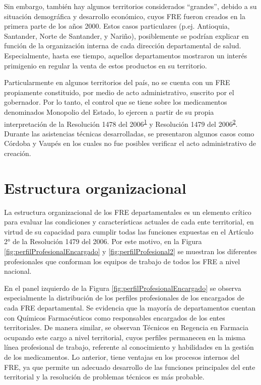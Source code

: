 \documentclass[
  oneside]{book}
\begin{document}
Sin embargo, también hay algunos territorios considerados ``grandes'', debido a su situación demográfica y desarrollo económico, cuyos FRE fueron creados en la primera parte de los años 2000. Estos casos particulares (p.ej. Antioquia, Santander, Norte de Santander, y Nariño), posiblemente se podrían explicar en función de la organización interna de cada dirección departamental de salud. Especialmente, hasta ese tiempo, aquellos departamentos mostraron un interés primigenio en regular la venta de estos productos en su territorio.

Particularmente en algunos territorios del país, no se cuenta con un FRE propiamente constituido, por medio de acto administrativo, suscrito por el gobernador. Por lo tanto, el control que se tiene sobre los medicamentos denominados Monopolio del Estado, lo ejercen a partir de su propia interpretación de la Resolución 1478 del 2006\textsuperscript{\protect\hyperlink{ref-MSPS1478-2006}{1}} y Resolución 1479 del 2006\textsuperscript{\protect\hyperlink{ref-MSPS1479-2006}{2}}. Durante las asistencias técnicas desarrolladas, se presentaron algunos casos como Córdoba y Vaupés en los cuales no fue posibles verificar el acto administrativo de creación.

\hypertarget{estructura-organizacional}{%
\section{Estructura organizacional}\label{estructura-organizacional}}

La estructura organizacional de los FRE departamentales es un elemento crítico para evaluar las condiciones y características actuales de cada ente territorial, en virtud de su capacidad para cumplir todas las funciones expuestas en el Artículo 2° de la Resolución 1479 del 2006. Por este motivo, en la Figura \ref{fig:perfilProfesionalEncargado} y \ref{fig:perfilProfesional2} se muestran los diferentes profesionales que conforman los equipos de trabajo de todos los FRE a nivel nacional.

En el panel izquierdo de la Figura \ref{fig:perfilProfesionalEncargado} se observa especialmente la distribución de los perfiles profesionales de los encargados de cada FRE departamental. Se evidencia que la mayoría de departamentos cuentan con Químicos Farmacéuticos como responsables encargados de los entes territoriales. De manera similar, se observan Técnicos en Regencia en Farmacia ocupando este cargo a nivel territorial, cuyos perfiles permanecen en la misma línea profesional de trabajo, referente al conocimiento y habilidades en la gestión de los medicamentos. Lo anterior, tiene ventajas en los procesos internos del FRE, ya que permite un adecuado desarrollo de las funciones principales del ente territorial y la resolución de problemas técnicos es más probable.
\end{document}
